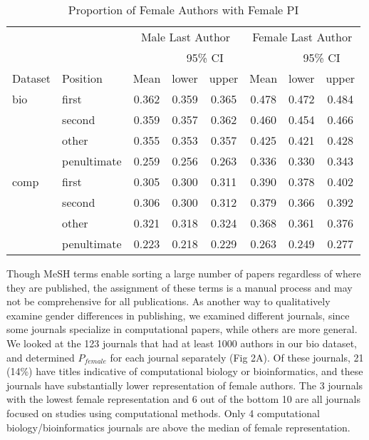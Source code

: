 \documentclass[10pt,letterpaper]{article}
\begin{document}
\begin{flushleft}
\begin{table}[]
\centering
\caption{Proportion of Female Authors with Female PI}
\label{Table 2}
\begin{tabular}{llcccccc}
\toprule
        &                 & \multicolumn{3}{c}{Male Last Author} & \multicolumn{3}{c}{Female Last Author} \\
\cmidrule(r){3-8}
        &                 &       & \multicolumn{2}{c}{95\% CI}  &        & \multicolumn{2}{c}{95\% CI}   \\
\cmidrule(r){4-5}\cmidrule(r){7-8}
Dataset & Position        & Mean  & lower        & upper         & Mean   & lower        & upper          \\
\midrule
bio     & first           & 0.362 & 0.359        & 0.365          & 0.478 & 0.472        & 0.484          \\
        & second          & 0.359 & 0.357        & 0.362          & 0.460 & 0.454        & 0.466          \\
        & other           & 0.355 & 0.353        & 0.357          & 0.425 & 0.421        & 0.428          \\
        & penultimate     & 0.259 & 0.256        & 0.263          & 0.336 & 0.330        & 0.343          \\
comp    & first           & 0.305 & 0.300        & 0.311          & 0.390 & 0.378        & 0.402          \\
        & second          & 0.306 & 0.300        & 0.312          & 0.379 & 0.366        & 0.392          \\
        & other           & 0.321 & 0.318        & 0.324          & 0.368 & 0.361        & 0.376          \\
        & penultimate     & 0.223 & 0.218        & 0.229          & 0.263 & 0.249        & 0.277          \\
\bottomrule
\end{tabular}
\end{table}

Though MeSH terms enable sorting a large number of papers regardless of where they are published, the assignment of these terms is a manual process and may not be comprehensive for all publications. As another way to qualitatively examine gender differences in publishing, we examined different journals, since some journals specialize in computational papers, while others are more general. We looked at the 123  journals that had at least 1000 authors in our bio dataset, and determined $P_{female}$ for each journal separately (Fig 2A). Of these journals, 21 (14\%) have titles indicative of computational biology or bioinformatics, and these journals have substantially lower representation of female authors. The 3 journals with the lowest female representation and 6 out of the bottom 10 are all journals focused on studies using computational methods. Only 4 computational biology/bioinformatics journals are above the median of female representation.


\end{flushleft}
\end{document}
